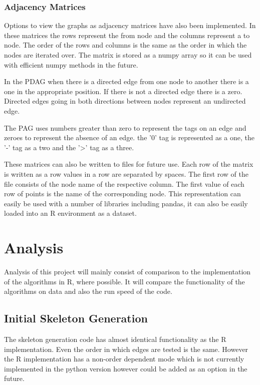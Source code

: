\documentclass{UoYCSproject}
\begin{document}
\subsection{Adjacency Matrices}
Options to view the graphs as adjacency matrices have also been implemented. In these matrices the rows represent the from node and the columns represent a to node. The order of the rows and columns is the same as the order in which the nodes are iterated over. The matrix is stored as a numpy array so it can be used with efficient numpy methods in the future.

In the PDAG when there is a directed edge from one node to another there is a one in the appropriate position. If there is not a directed edge there is a zero. Directed edges going in both directions between nodes represent an undirected edge.
 
The PAG uses numbers greater than zero to represent the tags on an edge and zeroes to represent the absence of an edge. the '0' tag is represented as a one, the '-' tag as a two and the '>' tag as a three.

These matrices can also be written to files for future use. Each row of the matrix is written as a row values in a row are separated by spaces. The first row of the file consists of the node name of the respective column. The first value of each row of points is the name of the corresponding node. This representation can easily be used with a number of libraries including pandas, it can also be easily loaded into an R environment as a dataset.

\chapter{Analysis}
Analysis of this project will mainly consist of comparison to the implementation of the algorithms in R, where possible. It will compare the functionality of the algorithms on data and also the run speed of the code.

\section{Initial Skeleton Generation}
The skeleton generation code has almost identical functionality as the R implementation. Even the order in which edges are tested is the same. However the R implementation has a non-order dependent mode which is not currently implemented in the python version however could be added as an option in the future.
\end{document}
